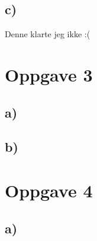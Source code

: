 \documentclass[12pt,norsk,a4paper]{article}
\begin{document}
\subsection{c)} %
\label{sub:c_}
Denne klarte jeg ikke :(
\clearpage
\section{Oppgave 3} %
\label{sec:oppgave_3}
\subsection{a)} %
\label{sub:a_}
\subsection{b)}
\clearpage
\section{Oppgave 4} %
\label{sec:oppgave_4}
\subsection{a)} %
\label{sub:a_}
\end{document}
